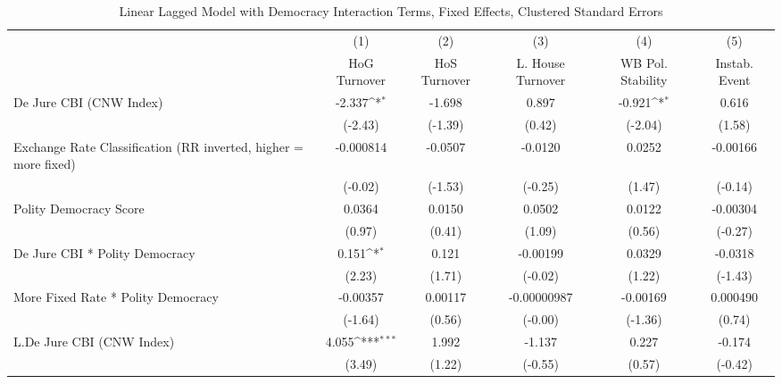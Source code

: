 {
\def\sym#1{\ifmmode^{#1}\else\(^{#1}\)\fi}
\begin{longtable}{l*{5}{c}}
\caption{Linear Lagged Model with Democracy Interaction Terms, Fixed Effects, Clustered Standard Errors \label{demintlagsDJ}}\\
\hline\hline\endfirsthead\hline\endhead\hline\endfoot\endlastfoot
                &\multicolumn{1}{c}{(1)}&\multicolumn{1}{c}{(2)}&\multicolumn{1}{c}{(3)}&\multicolumn{1}{c}{(4)}&\multicolumn{1}{c}{(5)}\\
                &\multicolumn{1}{c}{HoG Turnover}&\multicolumn{1}{c}{HoS Turnover}&\multicolumn{1}{c}{L. House Turnover}&\multicolumn{1}{c}{WB Pol. Stability}&\multicolumn{1}{c}{Instab. Event}\\
\hline
De Jure CBI (CNW Index)&   -2.337\sym{*}  &   -1.698         &    0.897         &   -0.921\sym{*}  &    0.616         \\
                &  (-2.43)         &  (-1.39)         &   (0.42)         &  (-2.04)         &   (1.58)         \\
[1em]
Exchange Rate Classification (RR inverted, higher = more fixed)&-0.000814         &  -0.0507         &  -0.0120         &   0.0252         & -0.00166         \\
                &  (-0.02)         &  (-1.53)         &  (-0.25)         &   (1.47)         &  (-0.14)         \\
[1em]
Polity Democracy Score&   0.0364         &   0.0150         &   0.0502         &   0.0122         & -0.00304         \\
                &   (0.97)         &   (0.41)         &   (1.09)         &   (0.56)         &  (-0.27)         \\
[1em]
De Jure CBI * Polity Democracy&    0.151\sym{*}  &    0.121         & -0.00199         &   0.0329         &  -0.0318         \\
                &   (2.23)         &   (1.71)         &  (-0.02)         &   (1.22)         &  (-1.43)         \\
[1em]
More Fixed Rate * Polity Democracy& -0.00357         &  0.00117         &-0.00000987         & -0.00169         & 0.000490         \\
                &  (-1.64)         &   (0.56)         &  (-0.00)         &  (-1.36)         &   (0.74)         \\
[1em]
L.De Jure CBI (CNW Index)&    4.055\sym{***}&    1.992         &   -1.137         &    0.227         &   -0.174         \\
                &   (3.49)         &   (1.22)         &  (-0.55)         &   (0.57)         &  (-0.42)         \\

\end{longtable}}
